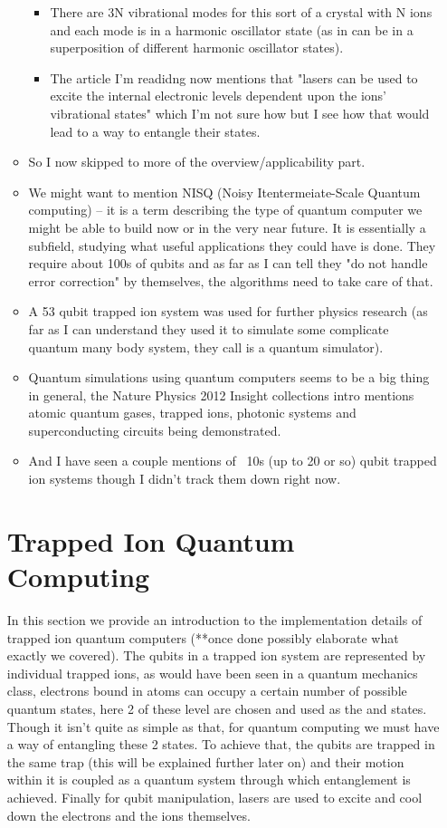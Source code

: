 \begin{itemize}
\begin{itemize}
\begin{itemize}
        \item There are 3N vibrational modes for this sort of a crystal with N ions and each mode is in a harmonic oscillator state (as in can be in a superposition of different harmonic oscillator states).
        \item The article I'm readidng now mentions that "lasers can be used to excite the internal electronic levels dependent upon the ions' vibrational states" which I'm not sure how but I see how that would lead to a way to entangle their states.
    \end{itemize}

    \item So I now skipped to more of the overview/applicability part.
    \item We might want to mention NISQ (Noisy Itentermeiate-Scale Quantum computing) -- it is a term describing the type of quantum computer we might be able to build now or in the very near future.
        It is essentially a subfield, studying what useful applications they could have is done. They require about 100s of qubits and as far as I can tell they "do not handle error correction" by themselves, the algorithms need to take care of that.
    \item A 53 qubit trapped ion system was used for further physics research (as far as I can understand they used it to simulate some complicate quantum many body system, they call is a quantum simulator).
    \item Quantum simulations using quantum computers seems to be a big thing in general, the Nature Physics 2012 Insight collections intro mentions atomic quantum gases, trapped ions, photonic systems and superconducting circuits being demonstrated.
    \item And I have seen a couple mentions of ~10s (up to 20 or so) qubit trapped ion systems though I didn't track them down right now.
\end{itemize}

\section{Trapped Ion Quantum Computing}
In this section we provide an introduction to the implementation details of trapped ion quantum computers (**once done possibly elaborate what exactly we covered).
The qubits in a trapped ion system are represented by individual trapped ions, as would have been seen in a quantum mechanics class, electrons bound in atoms can occupy a certain number of possible quantum states, here 2 of these level are chosen and used as the \kz and \ko states.
Though it isn't quite as simple as that, for quantum computing we must have a way of entangling these 2 states.
To achieve that, the qubits are trapped in the same trap (this will be explained further later on) and their motion within it is coupled as a quantum system through which entanglement is achieved.
Finally for qubit manipulation, lasers are used to excite and cool down the electrons and the ions themselves.


\end{itemize}
